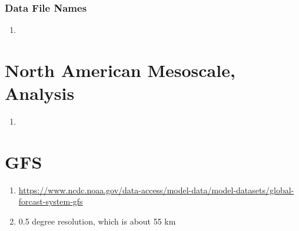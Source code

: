 \subsubsection*{Data File Names}
\begin{enumerate}
\item 
\end{enumerate} 

\section{North American Mesoscale, Analysis}

\begin{enumerate}
\item 

\end{enumerate}

\section{GFS}

\begin{enumerate}
\item \url{https://www.ncdc.noaa.gov/data-access/model-data/model-datasets/global-forcast-system-gfs}
\item 0.5 degree resolution, which is about 55 km %

\end{enumerate}